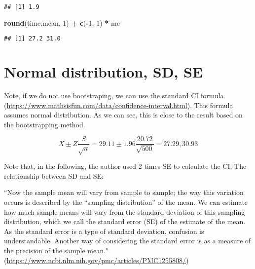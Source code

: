 \documentclass[]{book}
\newenvironment{Shaded}{\begin{snugshade}}{\end{snugshade}}
\newcommand{\DecValTok}[1]{\textcolor[rgb]{0.00,0.00,0.81}{#1}}
\newcommand{\KeywordTok}[1]{\textcolor[rgb]{0.13,0.29,0.53}{\textbf{#1}}}
\newcommand{\NormalTok}[1]{#1}
\newcommand{\OperatorTok}[1]{\textcolor[rgb]{0.81,0.36,0.00}{\textbf{#1}}}
\newcommand{\StringTok}[1]{\textcolor[rgb]{0.31,0.60,0.02}{#1}}
\begin{document}
\begin{verbatim}
## [1] 1.9
\end{verbatim}

\begin{Shaded}
\begin{Highlighting}[]
\KeywordTok{round}\NormalTok{(time.mean, }\DecValTok{1}\NormalTok{) }\OperatorTok{+}\StringTok{ }\KeywordTok{c}\NormalTok{(}\OperatorTok{-}\DecValTok{1}\NormalTok{, }\DecValTok{1}\NormalTok{) }\OperatorTok{*}\StringTok{ }\NormalTok{me}
\end{Highlighting}
\end{Shaded}

\begin{verbatim}
## [1] 27.2 31.0
\end{verbatim}

\hypertarget{normal-distribution-sd-se}{%
\section{Normal distribution, SD, SE}\label{normal-distribution-sd-se}}

Note, if we do not use bootstraping, we can use the standard CI formula (\url{https://www.mathsisfun.com/data/confidence-interval.html}). This formula assumes normal distribution. As we can see, this is close to the result based on the bootstrapping method.

\[\overline{X} \pm Z \frac{S}{\sqrt{n}}=29.11 \pm 1.96 \frac{20.72}{\sqrt{500}}=27.29, 30.93\]

Note that, in the following, the author used 2 times SE to calculate the CI. The relationship between SD and SE:

``Now the sample mean will vary from sample to sample; the way this variation occurs is described by the ``sampling distribution'' of the mean. We can estimate how much sample means will vary from the standard deviation of this sampling distribution, which we call the standard error (SE) of the estimate of the mean. As the standard error is a type of standard deviation, confusion is understandable. Another way of considering the standard error is as a measure of the precision of the sample mean." (\url{https://www.ncbi.nlm.nih.gov/pmc/articles/PMC1255808/})
\end{document}
